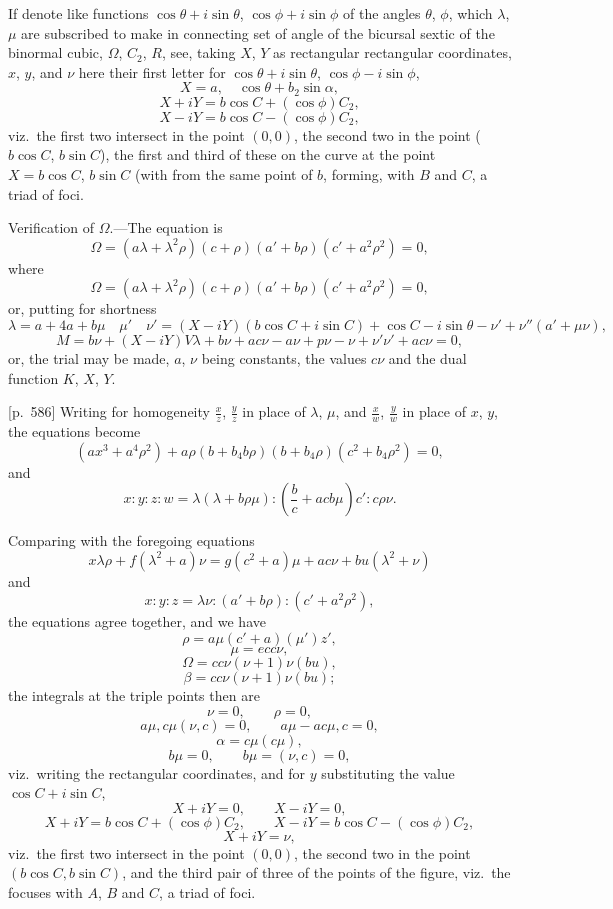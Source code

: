 \documentclass[11pt,a4paper]{book}
\begin{document}
If denote like functions $\cos \theta + i\sin \theta$, $\cos \phi + i\sin \phi$ of the angles $\theta$, $\phi$, which $\lambda$, $\mu$ are subscribed to make in connecting set of angle of the bicursal sextic of the binormal cubic, $\Omega$, $C_2$, $R$, see, taking $X$, $Y$ as rectangular rectangular coordinates, $x$, $y$, and $\nu$ here their first letter for $\cos \theta + i\sin \theta$, $\cos \phi - i\sin \phi$,
\[
X = a, \quad \cos \theta + b_2\sin \alpha,
\]
\[
X + iY = b\cos C + (\cos \phi)C_2,
\]
\[
X - iY = b\cos C - (\cos \phi)C_2,
\]
viz.\ the first two intersect in the point $(0, 0)$, the second two in the point ($b\cos C$, $b\sin C$), the first and third of these on the curve at the point $X = b\cos C$, $b\sin C$ (with from the same point of $b$, forming, with $B$ and $C$, a triad of foci.

Verification of $\Omega$.---The equation is
\[
\Omega = (a\lambda + \lambda^2\rho)(c + \rho)(a' + b\rho)(c' + a^2\rho^2) = 0,
\]
where
\[
\Omega = (a\lambda + \lambda^2\rho)(c + \rho)(a' + b\rho)(c' + a^2\rho^2) = 0,
\]
or, putting for shortness
\[
\lambda = a + 4a + b\mu \quad\mu' \quad\nu' = (X - i Y)(b\cos C + i\sin C) + \cos C - i\sin\theta - \nu' + \nu''(a' + \mu\nu),
\]
\[
M = b\nu + (X - iY)V\lambda + b\nu + a c\nu - a\nu + p\nu - \nu + \nu'\nu' + a c\nu = 0,
\]
or, the trial may be made, $a$, $\nu$ being constants, the values $c\nu$ and the dual function $K$, $X$, $Y$.

\bigskip

[p.~586] Writing for homogeneity $\frac{x}{z}$, $\frac{y}{z}$ in place of $\lambda$, $\mu$, and $\frac{x}{w}$, $\frac{y}{w}$ in place of $x$, $y$, the equations become
\[
(a x^3 + a^4 \rho^2) + a \rho(b + b_4 b\rho)(b + b_4 \rho)(c^2 + b_4 \rho^2) = 0,
\]
and
\[
x : y : z : w = \lambda(\lambda + b\rho\mu): \left(\frac{b}{c} + a c b\mu\right)c': c\rho\nu.
\]

Comparing with the foregoing equations
\[
x \lambda \rho + f(\lambda^2 + a)\nu = g(c^2 + a)\mu + a c\nu + b u(\lambda^2 + \nu)
\]
and
\[
x : y : z = \lambda\nu : (a' + b\rho): (c' + a^2\rho^2),
\]
the equations agree together, and we have
\[
\rho = a\mu(c' + a)(\mu')z',
\]
\[
\mu = e c c\nu,
\]
\[
\Omega = c c\nu(\nu + 1)\nu(b u),
\]
\[
\beta = c c\nu(\nu + 1)\nu(b u);
\]
the integrals at the triple points then are
\[
\nu = 0, \qquad \rho = 0,
\]
\[
a\mu, c\mu(\nu, c) = 0, \qquad a\mu - a c\mu, c = 0,
\]
\[
\alpha = c\mu(c\mu),
\]
\[
b\mu = 0, \qquad b\mu = (\nu, c) = 0,
\]
viz.\ writing the rectangular coordinates, and for $y$ substituting the value $\cos C + i\sin C$,
\[
X + iY = 0, \qquad X - iY = 0,
\]
\[
X + iY = b\cos C + (\cos \phi)C_2, \qquad X - iY = b\cos C - (\cos \phi)C_2,
\]
\[
X + iY = \nu,
\]
viz.\ the first two intersect in the point $(0, 0)$, the second two in the point $(b\cos C, b\sin C)$, and the third pair of three of the points of the figure, viz.\ the focuses with $A$, $B$ and $C$, a triad of foci.
\end{document}

